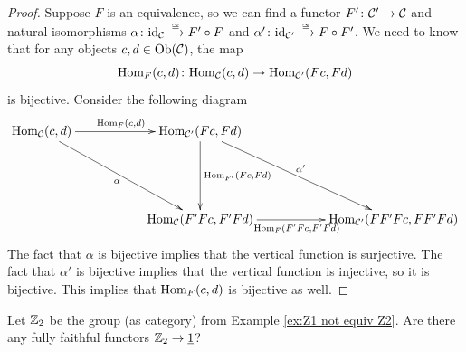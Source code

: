 \documentclass[CT4S-EN-RU]{subfiles}
\begin{document}
\begin{proof}

Suppose $F$ is an equivalence, so we can find a functor $F'\colon\mathcal{C}'\rightarrow\mathcal{C}$ and natural isomorphisms $\alpha\colon\textnormal{id}_\mathcal{C}\xrightarrow{\cong}F'\circ F$ and $\alpha'\colon\textnormal{id}_{\mathcal{C}'}\xrightarrow{\cong} F\circ F'$. We need to know that for any objects $c,d\in\textnormal{Ob}(\mathcal{C})$, the map $$\textnormal{Hom}_F(c,d)\colon\textnormal{Hom}_\mathcal{C}(c,d)\rightarrow\textnormal{Hom}_{\mathcal{C}'}(Fc,Fd)$$ is bijective. Consider the following diagram 
$$
\xymatrix{
\Hom_\mcC(c,d)\ar[rr]^{\Hom_F(c,d)}\ar[ddrr]_\alpha&&\Hom_{\mcC'}(Fc,Fd)\ar[ddrr]^{\alpha'}\ar[dd]^{\Hom_{F'}(Fc,Fd)}\\\\
&&\Hom_\mcC(F'Fc,F'Fd)\ar[rr]_{\Hom_{F}(F'Fc,F'Fd)}&&\Hom_{\mcC'}(FF'Fc,FF'Fd)
}
$$
The fact that $\alpha$ is bijective implies that the vertical function is surjective. The fact that $\alpha'$ is bijective implies that the vertical function is injective, so it is bijective. This implies that $\textnormal{Hom}_F(c,d)$ is bijective as well.

\end{proof}

\begin{exercise}
Let ${\mathbb Z}_2$ be the group (as category) from Example \ref{ex:Z1 not equiv Z2}. Are there any fully faithful functors ${\mathbb Z}_2\rightarrow\underline{1}$?
\end{exercise}
\end{document}
